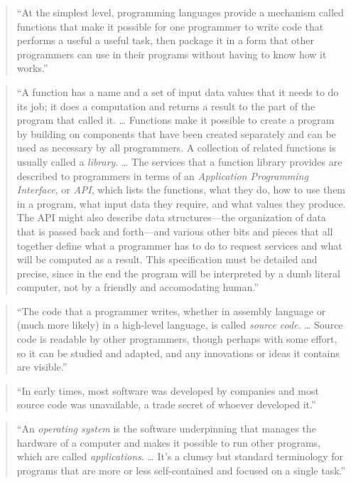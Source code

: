 \documentclass[]{tufte-book}
\begin{document}
\begin{quote}
``At the simplest level, programming languages provide a mechanism called functions that make
it possible for one programmer to write code that performs a useful a useful task, then package
it in a form that other programmers can use in their programs without having to know how it
works.'' \citep{kernighan2011d}
\end{quote}

\begin{quote}
``A function has a name and a set of input data values that it needs to do its job; it does
a computation and returns a result to the part of the program that called it. \ldots{} Functions
make it possible to create a program by building on components that have been created separately
and can be used as necessary by all programmers. A collection of related functions is usually
called a \emph{library}. \ldots{} The services that a function library provides are described to programmers
in terms of an \emph{Application Programming Interface}, or \emph{API}, which lists the functions, what
they do, how to use them in a program, what input data they require, and what values they
produce. The API might also describe data structures---the organization of data that is passed
back and forth---and various other bits and pieces that all together define what a programmer
has to do to request services and what will be computed as a result. This specification must
be detailed and precise, since in the end the program will be interpreted by a dumb literal
computer, not by a friendly and accomodating human.'' \citep{kernighan2011d}
\end{quote}

\begin{quote}
``The code that a programmer writes, whether in assembly language or (much more likely) in
a high-level language, is called \emph{source code}. \ldots{} Source code is readable by other programmers,
though perhaps with some effort, so it can be studied and adapted, and any innovations or ideas
it contains are visible.'' \citep{kernighan2011d}
\end{quote}

\begin{quote}
``In early times, most software was developed by companies and most source code was
unavailable, a trade secret of whoever developed it.'' \citep{kernighan2011d}
\end{quote}

\begin{quote}
``An \emph{operating system} is the software underpinning that manages the hardware of a
computer and makes it possible to run other programs, which are called \emph{applications}.
\ldots{} It's a clumsy but standard terminology for programs that are more or less self-contained
and focused on a single task.'' \citep{kernighan2011d}
\end{quote}
\end{document}
